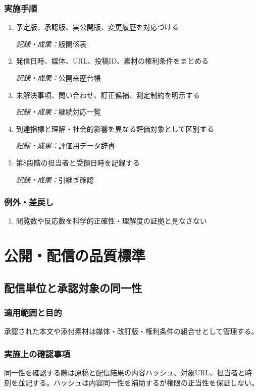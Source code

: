 \documentclass[a4paper,11pt]{article}
\begin{document}
\subsubsection*{実施手順}
\begin{enumerate}[leftmargin=2em,itemsep=0.65em]
\item 予定版、承認版、実公開版、変更履歴を対応づける\par\noindent\textit{記録・成果：}版関係表\nobreak\smallskip
\item 発信日時、媒体、URL、投稿ID、素材の権利条件をまとめる\par\noindent\textit{記録・成果：}公開来歴台帳\nobreak\smallskip
\item 未解決事項、問い合わせ、訂正候補、測定制約を明示する\par\noindent\textit{記録・成果：}継続対応一覧\nobreak\smallskip
\item 到達指標と理解・社会的影響を異なる評価対象として区別する\par\noindent\textit{記録・成果：}評価用データ辞書\nobreak\smallskip
\item 第8段階の担当者と受領日時を記録する\par\noindent\textit{記録・成果：}引継ぎ確認\nobreak\smallskip
\end{enumerate}
\subsubsection*{例外・差戻し}
\begin{enumerate}[leftmargin=2em,itemsep=0.35em]
\item 閲覧数や反応数を科学的正確性・理解度の証拠と見なさない
\end{enumerate}
\section{公開・配信の品質標準}
\subsection{配信単位と承認対象の同一性}
\subsubsection{適用範囲と目的}
\par 承認された本文や添付素材は媒体・改訂版・権利条件の組合せとして管理する。\par\medskip
\subsubsection{実施上の確認事項}
\par 同一性を確認する際は原稿と配信結果の内容ハッシュ、対象URL、担当者と時刻を並記する。ハッシュは内容同一性を補助するが権限の正当性を保証しない。\par\medskip
\end{document}
